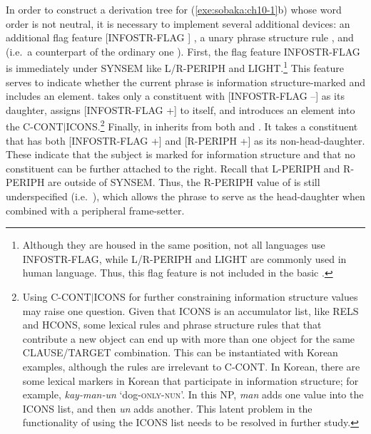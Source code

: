 
In order to construct a derivation tree for (\ref{exe:sobaka:ch10-1}b)
whose word order is not neutral, it is necessary to implement several
additional devices: an additional flag feature [INFOSTR-FLAG
  ] , a unary phrase structure rule
, and  (i.e.\ a
counterpart of the ordinary one
).
First, the flag feature INFOSTR-FLAG is immediately under SYNSEM like
L/R-PERIPH and LIGHT.\footnote{Although they are housed in the same
  position, not all languages use INFOSTR-FLAG, while L/R-PERIPH and
  LIGHT are commonly used in human language. Thus, this flag feature
  is not included in the basic .} This feature serves to
indicate whether the current phrase is information structure-marked
and includes an  element.  takes
only a constituent with [INFOSTR-FLAG --] as its daughter, assigns
[INFOSTR-FLAG +] to itself, and introduces an  element into
the C-CONT{$\mid$}ICONS.\footnote{Using C-CONT{$\mid$}ICONS for
  further constraining information structure values may raise one
  question.  Given that ICONS is an accumulator list, like RELS and
  HCONS, some lexical rules and phrase structure rules that that
  contribute a new  object can end up with more than one
   object for the same CLAUSE/TARGET combination. This
  can be instantiated with Korean examples, although the rules are
  irrelevant to C-CONT.  In Korean, there are some lexical markers in
  Korean that participate in information structure; for example,
  \textit{kay-man-un} `dog-\textsc{only}-\textsc{nun}'. In this NP,
  \textit{man} adds one value into the ICONS list, and then
  \textit{un} adds another. This latent problem in the functionality
  of using the ICONS list needs to be resolved in further study.}
Finally,  in  inherits from both
 and . It takes a
constituent that has both [INFOSTR-FLAG +] and [R-PERIPH +] as its
non-head-daughter.  These indicate that the subject is marked for
information structure and that no constituent can be further attached
to the right. Recall that L-PERIPH and R-PERIPH are outside of
SYNSEM. Thus, the R-PERIPH value of  is still
underspecified (i.e.\ ), which allows the phrase to serve as
the head-daughter when combined with a peripheral frame-setter.


